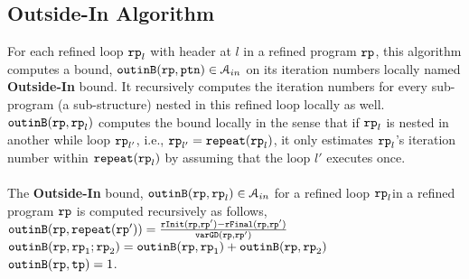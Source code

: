 \subsection{Outside-In Algorithm}
\label{sec:outinalg}
For each refined loop $\mathtt{rp}_l$ with header at $l$ in a refined program $\mathtt{rp}$, 
this algorithm
computes a bound, $\mathtt{outinB}(\mathtt{rp}, \mathtt{ptn}) \in \mathcal{A}_{in}$ on its iteration numbers locally named \textbf{Outside-In} bound.
It recursively computes the iteration numbers for every
sub-program (a sub-structure) nested in this refined loop locally as well.
\\
$\mathtt{outinB}(\mathtt{rp}, \mathtt{rp}_l)$
computes the bound locally
in the sense that
if $\mathtt{rp}_l$ is nested
in another while loop $\mathtt{rp}_{l'}$,
i.e., $\mathtt{rp}_{l'} = \mathtt{repeat}(\mathtt{rp}_l)$,
it only estimates
$\mathtt{rp}_{l}$'s iteration number within
$\mathtt{repeat}(\mathtt{rp}_l)$ by assuming that the loop $l'$ executes once.
\\ 
\\
The \textbf{Outside-In} bound, 
$\mathtt{outinB}(\mathtt{rp}, \mathtt{rp}_l) \in \mathcal{A}_{in}$
for a refined loop $\mathtt{rp}_l$in a refined program $\mathtt{rp}$
is computed recursively as follows,
\\
$\mathtt{outinB}(\mathtt{rp}, \mathtt{repeat}({\mathtt{rp}'})) =  \frac{\mathtt{rInit}(\mathtt{rp}, \mathtt{rp}') - \mathtt{rFinal}(\mathtt{rp}, \mathtt{rp}')}{\mathtt{varGD}(\mathtt{rp}, \mathtt{rp}')}$
\\
$\mathtt{outinB}(\mathtt{rp}, \mathtt{rp}_1; \mathtt{rp}_2) =  \mathtt{outinB}(\mathtt{rp}, \mathtt{rp}_1)+ \mathtt{outinB}(\mathtt{rp},  \mathtt{rp}_2)$
\\
$\mathtt{outinB}(\mathtt{rp}, \mathtt{tp}) =  1$.
\\

